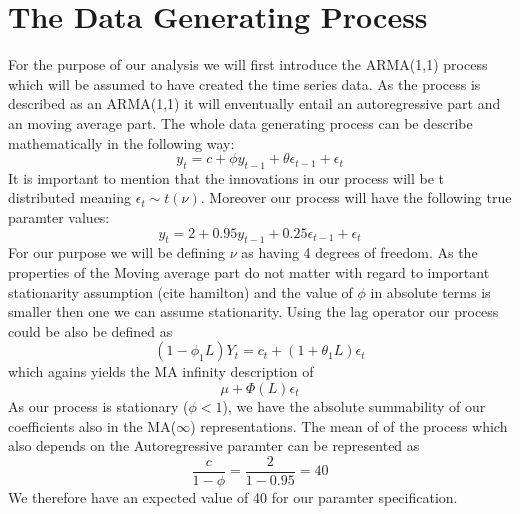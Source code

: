 \documentclass[a4paper,12pt]{article}
\begin{document}
\section{The Data Generating Process}
For the purpose of our analysis we will first introduce the ARMA(1,1) process which will be assumed to have created the time series data.
As the process is described as an ARMA(1,1) it will enventually entail an autoregressive part and an moving average part.
The whole data generating process can be describe mathematically in the following way:
\begin{equation}
    y_t = c + \phi y_{t-1} + \theta \epsilon_{t-1} + \epsilon_t
\end{equation}
It is important to mention that the innovations in our process will be t distributed meaning $\epsilon_t \sim t(\nu) $. Moreover our process will have the following true paramter values:
\begin{equation}
    y_t = 2 + 0.95y_{t-1} + 0.25\epsilon_{t-1} + \epsilon_t
\end{equation}
For our purpose we will be defining $\nu$ as having 4 degrees of freedom. 
As the properties of the Moving average part do not matter with regard to important stationarity assumption (cite hamilton) and the value of $\phi$ in absolute terms is smaller then one we can assume stationarity. 
Using the lag operator our process could be also be defined as 
\begin{equation}
    (1-\phi_1 L)Y_t = c_t + (1 + \theta_1L)\epsilon_t
\end{equation}
which agains yields the MA infinity description of 
\begin{equation}
    \mu + \Phi(L)\epsilon_t
\end{equation}
As our process is stationary ($\phi<1$), we have the absolute summability of our coefficients also in the MA($\infty$) representations.
The mean of of the process which also depends on the Autoregressive paramter can be represented as
\begin{equation}
\frac{c}{1-\phi} = \frac{2}{1-0.95} = 40
\end{equation}
We therefore have an expected value of 40 for our paramter specification.
\end{document}
